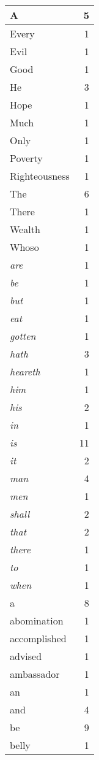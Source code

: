 \begin{center}
\begin{longtable}{l|r}
A & 5\\ \hline 
Every & 1\\ \hline 
Evil & 1\\ \hline 
Good & 1\\ \hline 
He & 3\\ \hline 
Hope & 1\\ \hline 
Much & 1\\ \hline 
Only & 1\\ \hline 
Poverty & 1\\ \hline 
Righteousness & 1\\ \hline 
The & 6\\ \hline 
There & 1\\ \hline 
Wealth & 1\\ \hline 
Whoso & 1\\ \hline 
\emph{are} & 1\\ \hline 
\emph{be} & 1\\ \hline 
\emph{but} & 1\\ \hline 
\emph{eat} & 1\\ \hline 
\emph{gotten} & 1\\ \hline 
\emph{hath} & 3\\ \hline 
\emph{heareth} & 1\\ \hline 
\emph{him} & 1\\ \hline 
\emph{his} & 2\\ \hline 
\emph{in} & 1\\ \hline 
\emph{is} & 11\\ \hline 
\emph{it} & 2\\ \hline 
\emph{man} & 4\\ \hline 
\emph{men} & 1\\ \hline 
\emph{shall} & 2\\ \hline 
\emph{that} & 2\\ \hline 
\emph{there} & 1\\ \hline 
\emph{to} & 1\\ \hline 
\emph{when} & 1\\ \hline 
a & 8\\ \hline 
abomination & 1\\ \hline 
accomplished & 1\\ \hline 
advised & 1\\ \hline 
ambassador & 1\\ \hline 
an & 1\\ \hline 
and & 4\\ \hline 
be & 9\\ \hline 
belly & 1\\ \hline 

\end{longtable}
\end{center}
